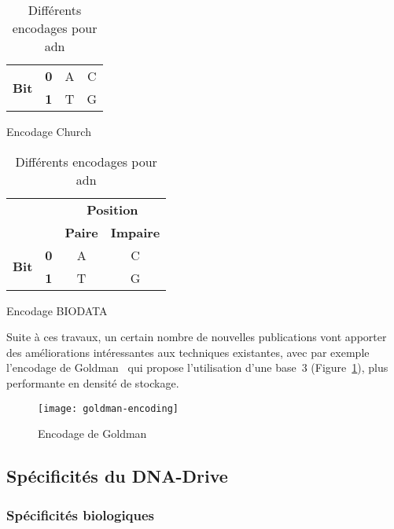 \documentclass[a4paper]{report}
\begin{document}
\begin{table}[ht]
\centering
\setlength{\tabcolsep}{.8em}
\renewcommand\arraystretch{1.5}

\begin{subtable}[t]{.45\textwidth}
  \centering
  \begin{tabular}{|c|c|c|c|}
  \hline
  \multirow{2}{*}{\textbf{Bit}} & \textbf{0} & A & C \\
  \cline{2-4}
  & \textbf{1} & T & G \\
  \hline
  \end{tabular}
  \caption{Encodage Church~\cite{church2012next}}
  \label{tab:church-encoding}
\end{subtable}
\hfill
\begin{subtable}[t]{.54\textwidth}
  \centering
  \begin{tabular}{|c|c|c|c|}
  \cline{3-4}
  \multicolumn{2}{c|}{} & \multicolumn{2}{c|}{\textbf{Position}} \\
  \cline{3-4}
  \multicolumn{2}{c|}{} & \textbf{Paire} & \textbf{Impaire} \\
  \hline
  \multirow{2}{*}{\textbf{Bit}} & \textbf{0} & A & C \\
  \cline{2-4}
  & \textbf{1} & T & G \\
  \hline
  \end{tabular}
  \caption{Encodage BIODATA}
  \label{tab:biodata-encoding}
\end{subtable}

\caption{Différents encodages pour \ac{adn}}
\label{tab:dna-encodings}
\end{table}

Suite à ces travaux, un certain nombre de nouvelles publications
vont apporter des améliorations intéressantes aux techniques existantes,
avec par exemple l'encodage de Goldman~\cite{goldman2013towards}
qui propose l'utilisation d'une base~3 (Figure~\ref{fig:goldman-encoding}),
plus performante en densité de stockage.

\begin{figure}[ht]
\centering
\texttt{[image: goldman-encoding]}
\caption{Encodage de Goldman~\cite{goldman2013towards}}
\label{fig:goldman-encoding}
\end{figure}


\subsection{Spécificités du DNA-Drive}

\subsubsection{Spécificités biologiques}
\end{document}
